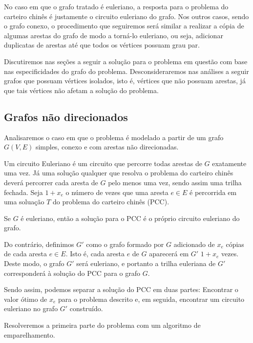 \documentclass[12pt, a4paper]{article}
\begin{document}
No caso em que o grafo tratado é euleriano, a resposta para o problema do carteiro chinês é justamente o circuito euleriano do grafo.
Nos outros casos, sendo o grafo conexo, o procedimento que seguiremos será similar a realizar a cópia de algumas arestas do grafo de modo a torná-lo euleriano, ou seja, adicionar duplicatas de arestas até que todos os vértices possuam grau par.

Discutiremos nas seções a seguir a solução para o problema em questão com base nas especificidades do grafo do problema. 
Desconsideraremos nas análises a seguir grafos que possuam vértices isolados, isto é, vértices que não possuam arestas, já que tais vértices não afetam a solução do problema.

\subsection{Grafos não direcionados}

Analisaremos o caso em que o problema é modelado a partir de um grafo $G(V, E)$ simples, conexo e com arestas não direcionadas.

Um circuito Euleriano é um circuito que percorre todas arestas de $G$ exatamente uma vez. 
Já uma solução qualquer que resolva o problema do carteiro chinês deverá percorrer cada aresta de $G$ pelo menos uma vez, sendo assim uma trilha fechada.
Seja $1 + x_e$ o número de vezes que uma aresta $e \in E$ é percorrida em uma soluação $T$ do problema do carteiro chinês (PCC).

Se $G$ é euleriano, então a solução para o PCC é o próprio circuito euleriano do grafo.

Do contrário, definimos $G'$ como o grafo formado por $G$ adicionado de $x_e$ cópias de cada aresta $e \in E$. 
Isto é, cada aresta $e$ de $G$ aparecerá em $G'$ $1 + x_e$ vezes.
Deste modo, o grafo $G'$ será euleriano, e portanto a trilha euleriana de $G'$ corresponderá à solução do PCC para o grafo $G$.

Sendo assim, podemos separar a solução do PCC em duas partes: Encontrar o valor ótimo de $x_e$ para o problema descrito e, em seguida, encontrar um circuito euleriano no grafo $G'$ construído.

Resolveremos a primeira parte do problema com um algoritmo de emparelhamento.

\end{document}
